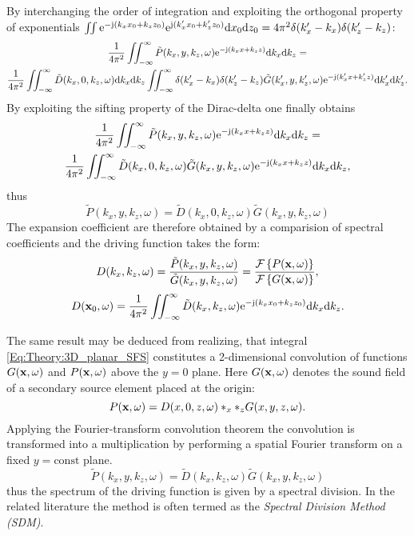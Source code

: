 By interchanging the order of integration and exploiting the orthogonal property of exponentials $\iint \mathrm{e}^{-\mathrm{j} (k_x x_0 + k_z z_0)}  \mathrm{e}^{\mathrm{j} (k_x' x_0 + k_z' z_0)} \mathrm{d} x_0 \mathrm{d} z_0 = 4\pi^2 \delta(k_x' - k_x) \delta(k_z' - k_z)$:
\begin{multline}
\frac{1}{4\pi^2} \iint_{-\infty}^{\infty} \tilde{P}(k_x,y,k_z, \omega) \mathrm{e}^{-\mathrm{j} (k_x x + k_z z)} \mathrm{d} k_x \mathrm{d} k_z
= 
\\
\frac{1}{4\pi^2}  \iint_{-\infty}^{\infty} \tilde{D}(k_x,0,k_z, \omega)\mathrm{d} k_x \mathrm{d} k_z
\iint_{-\infty}^{\infty} \delta(k_x' - k_x) \delta(k_z' - k_z) \tilde{G}(k_x',y,k_z', \omega)  \mathrm{e}^{-\mathrm{j} (k_x' x + k_z' z)} \mathrm{d} k_x' \mathrm{d} k_z'.
\end{multline}
By exploiting the sifting property of the Dirac-delta one finally obtains
\begin{multline}
\frac{1}{4\pi^2} \iint_{-\infty}^{\infty} \tilde{P}(k_x,y,k_z, \omega) \mathrm{e}^{-\mathrm{j} (k_x x + k_z z)} \mathrm{d} k_x \mathrm{d} k_z
= 
\\
\frac{1}{4\pi^2}  \iint_{-\infty}^{\infty} \tilde{D}(k_x,0,k_z, \omega)
 \tilde{G}(k_x,y,k_z, \omega)  \mathrm{e}^{-\mathrm{j} (k_x x + k_z z)} \mathrm{d} k_x \mathrm{d} k_z,
\end{multline}
thus
\begin{equation}
\tilde{P}(k_x,y,k_z, \omega) = \tilde{D}(k_x,0,k_z, \omega)  \tilde{G}(k_x,y,k_z, \omega) 
\end{equation}
The expansion coefficient are therefore obtained by a comparision of spectral coefficients and the driving function takes the form:
\begin{equation}
D(k_x,k_z,\omega) = \frac{\tilde{P}(k_x,y,k_z, \omega)}{ \tilde{G}(k_x,y,k_z, \omega)} = 
\frac{\mathcal{F}\left\{ P(\mathbf{x},\omega) \right\} }
{  \mathcal{F}\left\{ G(\mathbf{x},\omega) \right\} },
\end{equation}
\begin{equation}
D(\mathbf{x}_0,\omega) = \frac{1}{4\pi^2} \iint_{-\infty}^{\infty} \tilde{D}(k_x,k_z, \omega) \mathrm{e}^{-\mathrm{j} (k_x x_0 + k_z z_0)} \mathrm{d} k_x \mathrm{d} k_z.
\label{Eq:Theory:Dkx_inverse_Fourier}
\end{equation}

\vspace{3mm}
The same result may be deduced from realizing, that integral \eqref{Eq:Theory:3D_planar_SFS} constitutes a 2-dimensional convolution of functions $G(\mathbf{x},\omega)$ and $P(\mathbf{x},\omega)$ above the $y = 0$ plane. Here $G(\mathbf{x},\omega)$ denotes the sound field of a secondary source element placed at the origin:
\begin{equation}
P(\mathbf{x},\omega) = D(x,0,z,\omega)\ast_{x} \ast_{z} G(x,y,z,\omega).
\end{equation}
Applying the Fourier-transform convolution theorem the convolution is transformed into a multiplication by performing a spatial Fourier transform on a fixed $y = \mathrm{const}$ plane.
\begin{equation}
\tilde{P}(k_x,y,k_z,\omega) = \tilde{D}(k_x,k_z,\omega) \tilde{G}(k_x,y,k_z,\omega)
\end{equation}
 thus the spectrum of the driving function is given by a spectral division. In the related literature the method is often termed as 	the \emph{Spectral Division Method (SDM)}. 

